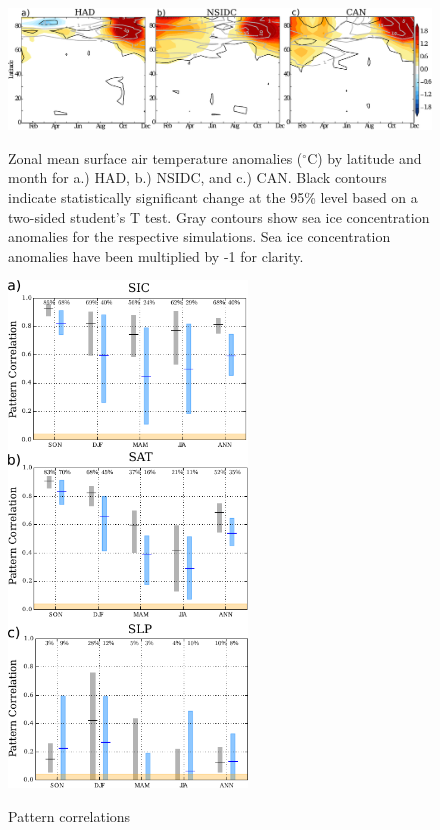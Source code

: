 \documentclass[twocol]{ametsoc}
\begin{document}
\begin{figure}[t]
  \noindent\includegraphics[width=39pc,angle=0]{SATwithlat.pdf}\\
  \caption{Zonal mean surface air temperature anomalies ($^\circ$C) by latitude and month for a.) HAD, b.) NSIDC, and c.) CAN. Black contours indicate statistically significant change at the 95\% level based on a two-sided student's T test. Gray contours show sea ice concentration anomalies for the respective simulations. Sea ice concentration anomalies have been multiplied by -1 for clarity.
}\label{f1b}
\end{figure}

\begin{figure}
  \noindent\includegraphics[width=15pc,angle=0]{pattcorrseas_cmpmeanBC.pdf}\\
  \caption{Pattern correlations
}\label{fig:fig4}
\end{figure}
\end{document}
